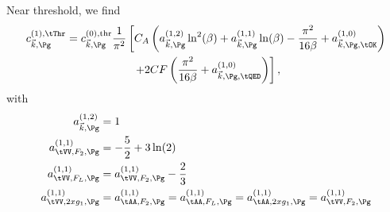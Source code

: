 Near threshold, we find
\begin{align}
c_{\vec k,\Pg}^{(1),\tThr} &= c_{\vec k,\Pg}^{(0),\text{thr}} \frac{1}{\pi^2}\left[
     C_A\left(a_{\vec k,\Pg}^{(1,2)}\ln^2(\beta) + a_{\vec k,\Pg}^{(1,1)}\ln(\beta) - \frac{\pi^2}{16\beta} + a_{\vec k,\Pg,\tOK}^{(1,0)}\right) \right. \nonumber\\
 &\hspace{60pt} \left. + 2CF\left(\frac{\pi^2}{16\beta} + a_{\vec k,\Pg,\tQED}^{(1,0)}\right)\right],
\end{align}
with
\begin{align}
a^{(1,2)}_{\vec k,\Pg} &= 1\\
a^{(1,1)}_{\tVV,F_2,\Pg} &= -\frac 5 2 + 3\ln(2)\\
a^{(1,1)}_{\tVV,F_L,\Pg} &= a^{(1,1)}_{\tVV,F_2,\Pg} - \frac 2 3\\
a^{(1,1)}_{\tVV,2xg_1,\Pg} &= a^{(1,1)}_{\tAA,F_2,\Pg} = a^{(1,1)}_{\tAA,F_L,\Pg} = a^{(1,1)}_{\tAA,2xg_1,\Pg}= a^{(1,1)}_{\tVV,F_2,\Pg}
\end{align}

